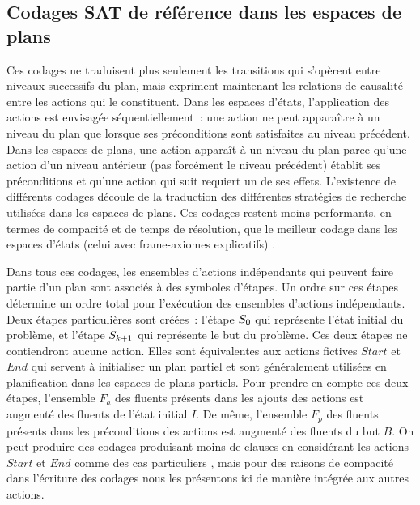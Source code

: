 %
%
\subsection{Codages SAT de référence dans les espaces de plans}


{\color{red}
Ces codages ne traduisent plus seulement les transitions qui s'opèrent entre
niveaux successifs du plan, mais expriment maintenant les relations de causalité
entre les actions qui le constituent. Dans les espaces d'états, l'application
des actions est envisagée séquentiellement~: une action ne peut apparaître à un
niveau du plan que lorsque ses préconditions sont satisfaites au niveau
précédent.  Dans les espaces de plans, une action apparaît à un niveau du plan
parce qu'une action d'un niveau antérieur (pas forcément le niveau précédent)
établit ses préconditions et qu'une action qui suit requiert un de ses effets.
L'existence de différents codages découle de la traduction des différentes
stratégies de recherche utilisées dans les espaces de plans. Ces codages restent
moins performants, en termes de compacité et de temps de résolution, que le
meilleur codage dans les espaces d'états (celui avec frame-axiomes explicatifs)
\cite{MK99}.

Dans tous ces codages, les ensembles d'actions indépendants qui peuvent faire
partie d'un plan sont associés à des symboles d'étapes. Un ordre sur ces étapes
détermine un ordre total pour l'exécution des ensembles d'actions indépendants.
Deux étapes particulières sont créées~: l'étape $S_{0}$ qui représente l'état
initial du problème, et l'étape $S_{k+1}$ qui représente le but du problème. Ces
deux étapes ne contiendront aucune action. Elles sont équivalentes aux actions
fictives $Start$ et $End$ qui servent à initialiser un plan partiel et sont généralement
utilisées en planification dans les espaces de plans partiels. Pour prendre en
compte ces deux étapes, l'ensemble $F_a$ des fluents présents dans les ajouts
des actions est augmenté des fluents de l'état initial $I$. De même, l'ensemble
$F_p$ des fluents présents dans les préconditions des actions est augmenté des
fluents du but $B$. On peut produire des codages produisant moins de clauses en
considérant les actions $Start$ et $End$ comme des cas particuliers
\cite{Vid01}, mais pour des raisons de compacité dans l'écriture des codages
nous les présentons ici de manière intégrée aux autres actions.

}
